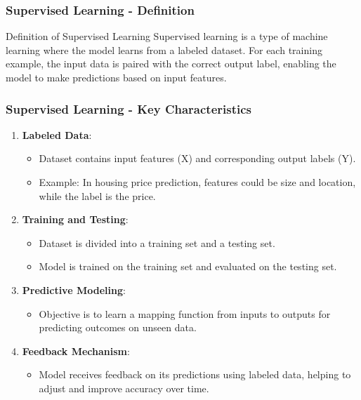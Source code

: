 \documentclass[aspectratio=169]{beamer}
\begin{document}
\begin{frame}[fragile]
    \frametitle{Supervised Learning - Definition}
    \begin{block}{Definition of Supervised Learning}
        Supervised learning is a type of machine learning where the model learns from a labeled dataset. For each training example, the input data is paired with the correct output label, enabling the model to make predictions based on input features.
    \end{block}
\end{frame}

\begin{frame}[fragile]
    \frametitle{Supervised Learning - Key Characteristics}
    \begin{enumerate}
        \item \textbf{Labeled Data}:
            \begin{itemize}
                \item Dataset contains input features (X) and corresponding output labels (Y). 
                \item Example: In housing price prediction, features could be size and location, while the label is the price.
            \end{itemize}
        \item \textbf{Training and Testing}:
            \begin{itemize}
                \item Dataset is divided into a training set and a testing set.
                \item Model is trained on the training set and evaluated on the testing set.
            \end{itemize}
        \item \textbf{Predictive Modeling}:
            \begin{itemize}
                \item Objective is to learn a mapping function from inputs to outputs for predicting outcomes on unseen data.
            \end{itemize}
        \item \textbf{Feedback Mechanism}:
            \begin{itemize}
                \item Model receives feedback on its predictions using labeled data, helping to adjust and improve accuracy over time.
            \end{itemize}
    \end{enumerate}
\end{frame}
\end{document}
